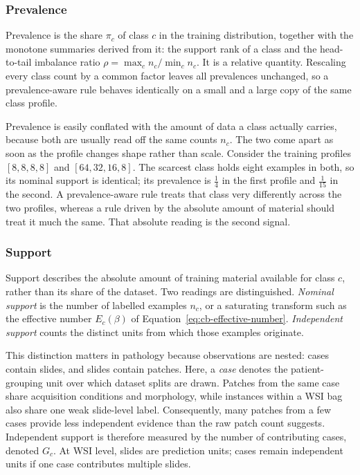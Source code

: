 \documentclass[11pt]{article}
\begin{document}
\subsubsection{Prevalence}
Prevalence is the share $\pi_c$ of class $c$ in the training distribution, together with the monotone summaries derived from it: the support rank of a class and the head-to-tail imbalance ratio $\rho=\max_c n_c/\min_c n_c$. It is a relative quantity. Rescaling every class count by a common factor leaves all prevalences unchanged, so a prevalence-aware rule behaves identically on a small and a large copy of the same class profile.

Prevalence is easily conflated with the amount of data a class actually carries, because both are usually read off the same counts $n_c$. The two come apart as soon as the profile changes shape rather than scale. Consider the training profiles $[8,8,8,8]$ and $[64,32,16,8]$. The scarcest class holds eight examples in both, so its nominal support is identical; its prevalence is $\tfrac{1}{4}$ in the first profile and $\tfrac{1}{15}$ in the second. A prevalence-aware rule treats that class very differently across the two profiles, whereas a rule driven by the absolute amount of material should treat it much the same. That absolute reading is the second signal.

\subsubsection{Support}
\label{sec:support-signal}
Support describes the absolute amount of training material available for class $c$, rather than its share of the dataset. Two readings are distinguished. \emph{Nominal support} is the number of labelled examples $n_c$, or a saturating transform such as the effective number $E_c(\beta)$ of Equation~\eqref{eq:cb-effective-number}. \emph{Independent support} counts the distinct units from which those examples originate.

This distinction matters in pathology because observations are nested: cases contain slides, and slides contain patches. Here, a \emph{case} denotes the patient-grouping unit over which dataset splits are drawn. Patches from the same case share acquisition conditions and morphology, while instances within a WSI bag also share one weak slide-level label. Consequently, many patches from a few cases provide less independent evidence than the raw patch count suggests. Independent support is therefore measured by the number of contributing cases, denoted $G_c$. At WSI level, slides are prediction units; cases remain independent units if one case contributes multiple slides.
\end{document}
